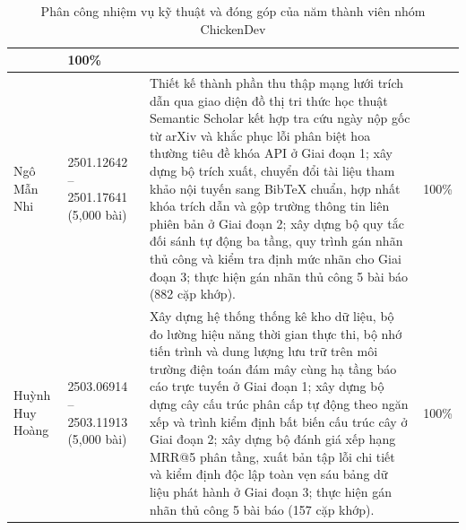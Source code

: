 \begin{table}[H]
\begin{tabularx}{\textwidth}{l p{} X c}
            & 100\% \\
        \midrule
        Ngô Mẫn Nhi & 2501.12642 -- 2501.17641 \newline (5{,}000 bài)
            & Thiết kế thành phần thu thập mạng lưới trích dẫn qua giao diện đồ thị tri thức học thuật Semantic Scholar kết hợp tra cứu ngày nộp gốc từ arXiv và khắc phục lỗi phân biệt hoa thường tiêu đề khóa API ở Giai đoạn 1; xây dựng bộ trích xuất, chuyển đổi tài liệu tham khảo nội tuyến sang BibTeX chuẩn, hợp nhất khóa trích dẫn và gộp trường thông tin liên phiên bản ở Giai đoạn 2; xây dựng bộ quy tắc đối sánh tự động ba tầng, quy trình gán nhãn thủ công và kiểm tra định mức nhãn cho Giai đoạn 3; thực hiện gán nhãn thủ công 5 bài báo (882 cặp khớp).
            & 100\% \\
        \midrule
        Huỳnh Huy Hoàng & 2503.06914 -- 2503.11913 \newline (5{,}000 bài)
            & Xây dựng hệ thống thống kê kho dữ liệu, bộ đo lường hiệu năng thời gian thực thi, bộ nhớ tiến trình và dung lượng lưu trữ trên môi trường điện toán đám mây cùng hạ tầng báo cáo trực tuyến ở Giai đoạn 1; xây dựng bộ dựng cây cấu trúc phân cấp tự động theo ngăn xếp và trình kiểm định bất biến cấu trúc cây ở Giai đoạn 2; xây dựng bộ đánh giá xếp hạng MRR@5 phân tầng, xuất bản tập lỗi chi tiết và kiểm định độc lập toàn vẹn sáu bảng dữ liệu phát hành ở Giai đoạn 3; thực hiện gán nhãn thủ công 5 bài báo (157 cặp khớp).
            & 100\% \\
        \bottomrule
    \end{tabularx}
    \caption{Phân công nhiệm vụ kỹ thuật và đóng góp của năm thành viên nhóm ChickenDev}
    \label{tab:contribution}
\end{table}
